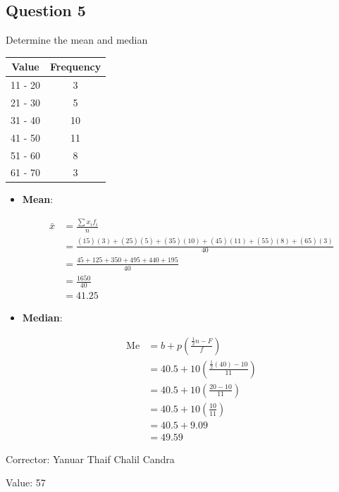 \documentclass[12pt,titlepage]{article}
\begin{document}
\pagebreak

\subsection{Question 5}
Determine the mean and median

\begin{center}
    \begin{tabular}{|c|c|}
        \hline
        Value & Frequency \\
        \hline
        11 - 20 & 3 \\
        \hline
        21 - 30 & 5 \\
        \hline
        31 - 40 & 10 \\
        \hline
        41 - 50 & 11 \\
        \hline
        51 - 60 & 8 \\
        \hline
        61 - 70 & 3 \\
        \hline
    \end{tabular}
\end{center}

\begin{itemize}
    \item {
        \textbf{Mean}:

        \begin{align*}
            \bar{x} &= \frac{\sum x_i f_i}{n}\\
            &= \frac{(15)(3) + (25)(5) + (35)(10) + (45)(11) + (55)(8) + (65)(3)}{40} \\
            &= \frac{45 + 125 + 350 + 495 + 440 + 195}{40} \\
            &= \frac{1650}{40} \\
            &= 41.25
        \end{align*}
    }
    \item {
        \textbf{Median}:

        \begin{align*}
            \text{Me} &= b + p \left( \frac{\frac{1}{2}n - F}{f} \right)\\
            &= 40.5 + 10 \left( \frac{\frac{1}{2}(40) - 10}{11} \right) \\
            &= 40.5 + 10 \left( \frac{20 - 10}{11} \right) \\
            &= 40.5 + 10 \left( \frac{10}{11} \right) \\
            &= 40.5 + 9.09 \\
            &= 49.59
        \end{align*}
    }
\end{itemize}

Corrector: Yanuar Thaif Chalil Candra

Value: 57
\end{document}
